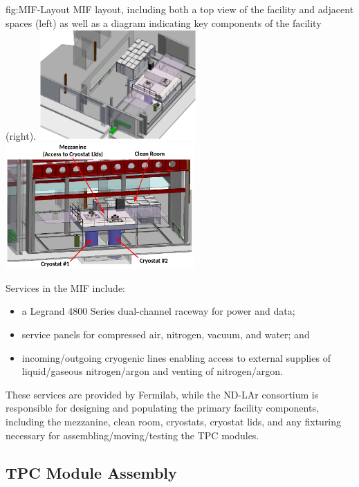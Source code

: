 \begin{dunefigure}{fig:MIF-Layout}
{MIF layout, including both a top view of the facility and adjacent spaces (left) as well as a diagram indicating key components of the facility (right).}
\includegraphics[width=0.452\textwidth]{graphics/lartpc/Construction/MIF-Layout-1.png}
\includegraphics[width=0.539\textwidth]{graphics/lartpc/Construction/MIF-Layout-2.png}
\end{dunefigure}

Services in the MIF include:
\begin{itemize}
    \item a Legrand 4800 Series dual-channel raceway for power and data;
    \item service panels for compressed air, nitrogen, vacuum, and water; and
    \item incoming/outgoing cryogenic lines enabling access to external supplies of liquid/gaseous nitrogen/argon and venting of nitrogen/argon.
\end{itemize}
These services are provided by Fermilab, while the ND-LAr consortium is responsible for designing and populating the primary facility components, including the mezzanine, clean room, cryostats, cryostat lids, and any fixturing necessary for assembling/moving/testing the TPC modules.

\subsection{TPC Module Assembly}

